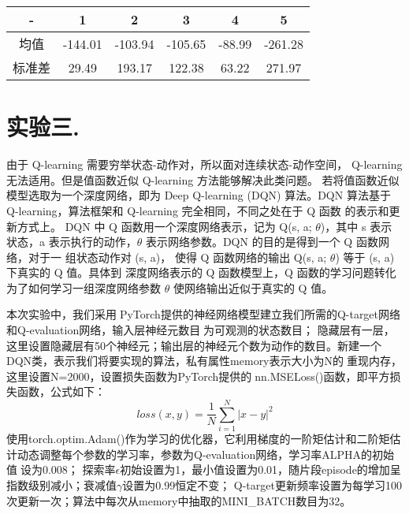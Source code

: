 \documentclass[a4paper,UTF8]{article}
\theoremstyle{definition}
\begin{document}

	\begin{tabular}{|c|c|c|c|c|c|}
	
		\hline
		
		\hline
		
		- & 1 & 2 & 3 & 4 & 5 \\
		
		\hline
		
		均值 & -144.01 & -103.94 & -105.65 & -88.99 & -261.28\\

		\hline

		标准差 & 29.49 & 193.17 & 122.38 & 63.22 & 271.97\\
		
		\hline
	
	\end{tabular}

\section*{实验三. }
由于 Q-learning 需要穷举状态-动作对，所以面对连续状态-动作空间， Q-learning 无法适用。但是值函数近似 Q-learning 方法能够解决此类问题。
若将值函数近似模型选取为一个深度网络，即为 Deep Q-learning (DQN) 算法。DQN 算法基于 Q-learning，算法框架和 Q-learning 完全相同，不同之处在于 Q 函数 的表示和更新方式上。
DQN 中 Q 函数用一个深度网络表示，记为 Q(s, a; $\theta$)，其中 s 表示 状态，a 表示执行的动作，$\theta$ 表示网络参数。DQN 的目的是得到一个 Q 函数网络，对于一 组状态动作对 (s, a)，
使得 Q 函数网络的输出 Q(s, a; $\theta$) 等于 (s, a) 下真实的 Q 值。具体到 深度网络表示的 Q 函数模型上，Q 函数的学习问题转化为了如何学习一组深度网络参数 $\theta$ 使网络输出近似于真实的 Q 值。
	
本次实验中，我们采用PyTorch提供的神经网络模型建立我们所需的Q-target网络和Q-evaluation网络，输入层神经元数目为可观测的状态数目；
隐藏层有一层，这里设置隐藏层有50个神经元；输出层的神经元个数为动作的数目。新建一个DQN类，表示我们将要实现的算法，私有属性memory表示大小为N的重现内存，
这里设置N=2000，设置损失函数为PyTorch提供的nn.MSELoss()函数，即平方损失函数，公式如下：
$$loss(x, y) = \frac{1}{N} \sum_{i=1}^N |x - y|^2$$
使用torch.optim.Adam()作为学习的优化器，它利用梯度的一阶矩估计和二阶矩估计动态调整每个参数的学习率，参数为Q-evaluation网络，学习率ALPHA的初始值设为0.008；
探索率$\epsilon$初始设置为1，最小值设置为0.01，随片段episode的增加呈指数级别减小；衰减值$\gamma$设置为0.99恒定不变；
Q-target更新频率设置为每学习100次更新一次；算法中每次从memory中抽取的MINI\_BATCH数目为32。
\end{document}
